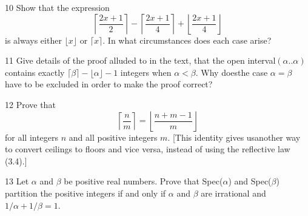 \documentclass[a4paper,12pt]{article}
\theoremstyle{definition}
\newenvironment{problems}{\begin{list}{}{\renewcommand{\makelabel}[1]{\textbf{##1}\hfil}}}{\end{list}}
\begin{document}
\begin{problems}
    \item[10]Show that the expression
    \begin{equation*}
        \left\lceil\frac{2x+1}{2}\right\rceil - \left\lceil\frac{2x+1}{4}\right\rceil + \left\lfloor\frac{2x+1}{4}\right\rfloor
    \end{equation*} 
    is always either $\lfloor x \rfloor$ or $\lceil x \rceil$. In what circumstances does each case arise?
    \item[11] Give details of the proof alluded to in the text,  that the open interval$(\alpha .. \alpha)$contains exactly $\lceil \beta\rceil-\lfloor \alpha\rfloor-1$ integers when $\alpha < \beta$.  Why doesthe case $\alpha=\beta$ have to be excluded in order to make the proof correct?
    \item[12]Prove that
    \begin{equation*}
        \left\lceil \frac{n}{m}\right\rceil = \left\lfloor\frac{n+m-1}{m}\right\rfloor
    \end{equation*} 
    for  all  integers $n$ and  all  positive  integers $m$.   [This  identity  gives  usanother way to convert ceilings to floors and vice versa, instead of using the reflective law (3.4).]
    \item[13]  Let $\alpha$ and $\beta$ be positive real numbers.  Prove that Spec($\alpha$) and Spec($\beta$) partition the positive integers if and only if $\alpha$ and $\beta$ are irrational and $1/\alpha+1/\beta=1$.
\end{problems}
\end{document}

